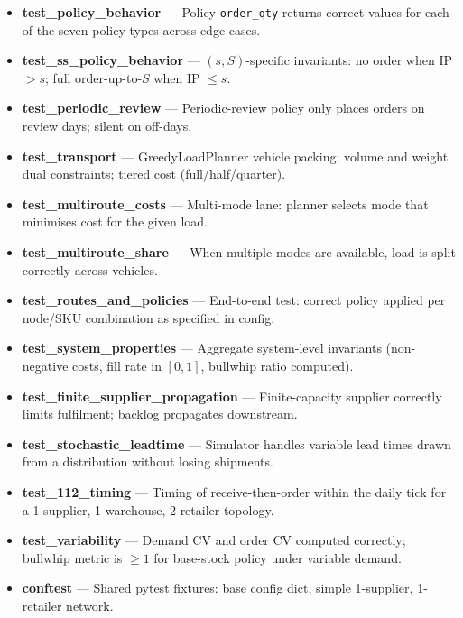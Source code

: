 \begin{itemize}
  \item \textbf{test\_policy\_behavior} ---
        Policy \texttt{order\_qty} returns correct values for each of
        the seven policy types across edge cases.

  \item \textbf{test\_ss\_policy\_behavior} ---
        $(s,S)$-specific invariants: no order when IP $> s$; full
        order-up-to-$S$ when IP $\leq s$.

  \item \textbf{test\_periodic\_review} ---
        Periodic-review policy only places orders on review days;
        silent on off-days.

  \item \textbf{test\_transport} ---
        GreedyLoadPlanner vehicle packing; volume and weight dual
        constraints; tiered cost (full/half/quarter).

  \item \textbf{test\_multiroute\_costs} ---
        Multi-mode lane: planner selects mode that minimises cost for
        the given load.

  \item \textbf{test\_multiroute\_share} ---
        When multiple modes are available, load is split correctly
        across vehicles.

  \item \textbf{test\_routes\_and\_policies} ---
        End-to-end test: correct policy applied per node/SKU combination
        as specified in config.

  \item \textbf{test\_system\_properties} ---
        Aggregate system-level invariants (non-negative costs, fill rate
        in $[0,1]$, bullwhip ratio computed).

  \item \textbf{test\_finite\_supplier\_propagation} ---
        Finite-capacity supplier correctly limits fulfilment; backlog
        propagates downstream.

  \item \textbf{test\_stochastic\_leadtime} ---
        Simulator handles variable lead times drawn from a distribution
        without losing shipments.

  \item \textbf{test\_112\_timing} ---
        Timing of receive-then-order within the daily tick for a
        1-supplier, 1-warehouse, 2-retailer topology.

  \item \textbf{test\_variability} ---
        Demand CV and order CV computed correctly; bullwhip metric is
        $\geq 1$ for base-stock policy under variable demand.

  \item \textbf{conftest} ---
        Shared pytest fixtures: base config dict, simple 1-supplier,
        1-retailer network.
\end{itemize}
